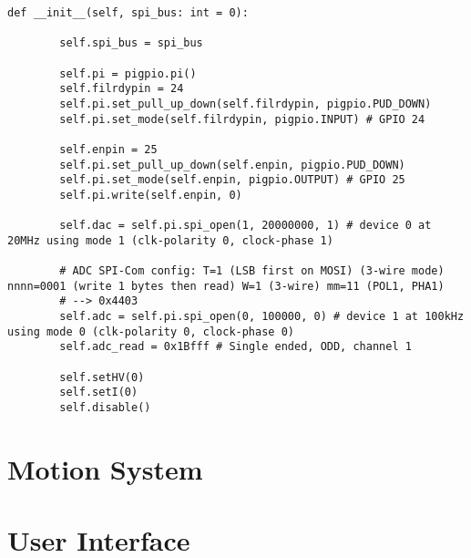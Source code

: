             \begin{lstlisting}[style=mypython,firstnumber=5, caption={[\texttt{Tube} class's constructor]\texttt{Tube} class's constructor.},label={lst:Tube constructor}]
    def __init__(self, spi_bus: int = 0):

        self.spi_bus = spi_bus

        self.pi = pigpio.pi()
        self.filrdypin = 24
        self.pi.set_pull_up_down(self.filrdypin, pigpio.PUD_DOWN)
        self.pi.set_mode(self.filrdypin, pigpio.INPUT) # GPIO 24

        self.enpin = 25
        self.pi.set_pull_up_down(self.enpin, pigpio.PUD_DOWN)
        self.pi.set_mode(self.enpin, pigpio.OUTPUT) # GPIO 25
        self.pi.write(self.enpin, 0)

        self.dac = self.pi.spi_open(1, 20000000, 1) # device 0 at 20MHz using mode 1 (clk-polarity 0, clock-phase 1)

        # ADC SPI-Com config: T=1 (LSB first on MOSI) (3-wire mode) nnnn=0001 (write 1 bytes then read) W=1 (3-wire) mm=11 (POL1, PHA1)
        # --> 0x4403
        self.adc = self.pi.spi_open(0, 100000, 0) # device 1 at 100kHz using mode 0 (clk-polarity 0, clock-phase 0)
        self.adc_read = 0x1Bfff # Single ended, ODD, channel 1

        self.setHV(0)
        self.setI(0)
        self.disable()
            \end{lstlisting}

    \section{Motion System}
        \lipsum
    \section{User Interface}
        \lipsum